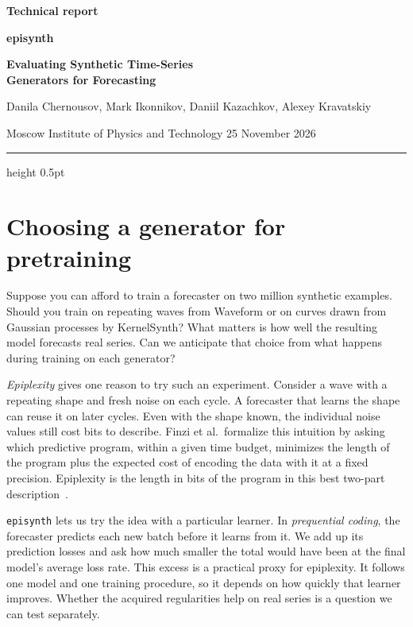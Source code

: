 \documentclass[11pt,a4paper]{article}
\begin{document}
\thispagestyle{plain}
{\sffamily\bfseries\small\color{reportmuted} Technical report\par}
\vspace{9pt}
{\fontsize{35}{38}\selectfont\bfseries\color{reportnavy} episynth\par}
{\LARGE\bfseries Evaluating Synthetic Time-Series\\Generators for Forecasting\par}
\vspace{8pt}
Danila Chernousov, Mark Ikonnikov, Daniil Kazachkov, Alexey Kravatskiy\\
{\small Moscow Institute of Physics and Technology \hfill 25 November 2026\par}
\vspace{7pt}
{\color{reportrule}\hrule height 0.5pt}
\vspace{7pt}

\section{Choosing a generator for pretraining}\label{sec:scope}
Suppose you can afford to train a forecaster on two million synthetic
examples. Should you train on repeating waves from Waveform or on curves
drawn from Gaussian processes by KernelSynth? What matters is how well
the resulting model forecasts real series. Can we anticipate that choice
from what happens during training on each generator?

\emph{Epiplexity} gives one reason to try such an experiment. Consider a
wave with a repeating shape and fresh noise on each cycle. A forecaster
that learns the shape can reuse it on later cycles. Even with the shape
known, the individual noise values still cost bits to describe. Finzi et
al.\ formalize this intuition by asking which predictive program, within a
given time budget, minimizes the length of the program plus the expected
cost of encoding the data with it at a fixed precision. Epiplexity is the
length in bits of the program in this best two-part description~\cite{finzi2026}.

\texttt{episynth} lets us try the idea with a particular learner. In
\emph{prequential coding}, the forecaster predicts each new batch before it
learns from it. We add up its prediction losses and ask how much smaller
the total would have been at the final model's average loss rate. This
excess is a practical proxy for epiplexity. It follows one model and one
training procedure, so it depends on how quickly that learner improves.
Whether the acquired regularities help on real series is a question we can
test separately.
\end{document}
